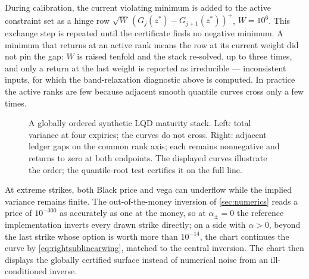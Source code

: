 During calibration, the current violating minimum is added to the active
constraint set as a hinge row
$\sqrt{W}\,(G_j(z^*)-G_{j+1}(z^*))^+$, $W=10^{6}$.  This exchange step is
repeated until the certificate finds no negative minimum.  A minimum
that returns at an active rank means the row at its current weight did
not pin the gap: $W$ is raised tenfold and the stack re-solved, up to
three times, and only a return at the last weight is reported as
irreducible --- inconsistent inputs, for which the band-relaxation
diagnostic above is computed.  In practice the active ranks are few
because adjacent smooth quantile curves cross only a few times.

\begin{figure}[htbp]
\centering
{}
\caption{A globally ordered synthetic LQD maturity stack.  Left: total
variance at four expiries; the curves do not cross.  Right: adjacent ledger
gaps on the common rank axis; each remains nonnegative and returns to zero at
both endpoints.  The displayed curves illustrate the order; the quantile-root
test certifies it on the full line.}
\label{fig:calendarglobal}
\end{figure}

At extreme strikes, both Black price and vega can underflow while the implied
variance remains finite.  The out-of-the-money inversion of
\cref{sec:numerics} reads a price of $10^{-300}$ as accurately as one
at the money, so at $\alpha_\pm=0$ the reference implementation
inverts every drawn strike directly; on a side with $\alpha>0$, beyond
the last strike whose option is worth more than $10^{-14}$, the chart
continues the curve by \eqref{eq:rightsublinearwing}, matched to the
central inversion.  The
chart then displays the globally certified surface instead of numerical noise
from an ill-conditioned inverse.
